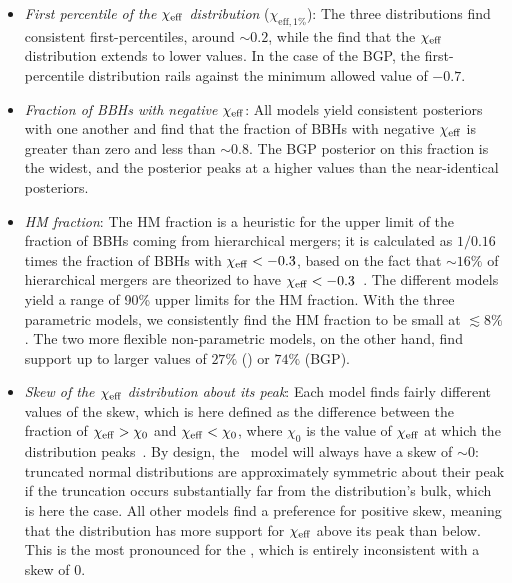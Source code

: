 \begin{itemize}
%
	\item \textit{First percentile of the $\chi_{\rm eff}$ distribution} ($\chi_{\mathrm{eff}, 1\%}$): 
	The three \parametricAdj distributions find consistent first-percentiles, around $\sim 0.2$, while the \nonparametricAdj find that the $\chi_{\rm eff}$ distribution extends to lower values. 
	In the case of the BGP, the first-percentile distribution rails against the minimum allowed value of $-0.7$. 
% 
	\item\textit{Fraction of \acp{BBH} with negative} $\chi_{\rm eff}$: 
	All models yield consistent posteriors with one another and find that the fraction of \acp{BBH} with negative $\chi_{\rm eff}$ is greater than zero and less than $\sim 0.8$. 
	The BGP posterior on this fraction is the widest, and the \BSpline posterior peaks at a higher values than the near-identical \parametricAdj posteriors.
% 
	\item \textit{HM fraction}:
	The HM fraction is a heuristic for the upper limit of the fraction of \acp{BBH} coming from hierarchical mergers; it is calculated as $1/0.16$ times the fraction of BBHs with $\chi_{\rm eff} < -0.3$, based on the fact that $\sim 16\%$ of hierarchical mergers are theorized to have $\chi_{\rm eff} < -0.3$~\citep{Fishbach:2022lzq,Baibhav:2020xdf}. 
	The different models yield a range of 90\% upper limits for the HM fraction.
    With the three parametric models, we consistently find the HM fraction to be small at $\lesssim 8\%$.
	The two more flexible non-parametric models, on the other hand, find support up to larger values of $27\%$ (\BSpline) or $74\%$ (BGP).
%
	\item \textit{Skew of the $\chi_{\rm eff}$ distribution about its peak}: 
	Each model finds fairly different values of the skew, which is here defined as the difference between the fraction of $\chi_{\rm eff} > \chi_0$ and $\chi_{\rm eff} < \chi_0$, where $\chi_0$ is the value of $\chi_{\rm eff}$ at which the distribution peaks~\citep[][Equation 5]{Banagiri:2025dxo}.
	By design, the \effectiveSpinModel~model will always have a skew of $\sim 0$: truncated normal distributions are approximately symmetric about their peak if the truncation occurs substantially far from the distribution's bulk, which is here the case.
	All other models find a preference for positive skew, meaning that the distribution has more support for $\chi_{\rm eff}$ above its peak than below. 
	This is the most pronounced for the \skewnormalChiEff, which is entirely inconsistent with a skew of 0. 
%
\end{itemize}
%


